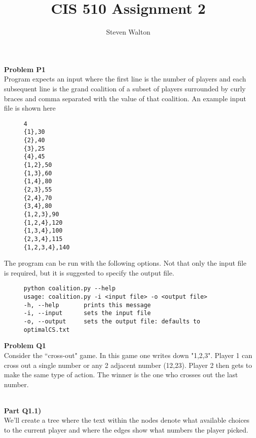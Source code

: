\documentclass[12pt,letter]{article}
\newcommand{\problem}[1]{\vspace{3mm}\Large\textbf{{Problem {#1}\vspace{3mm}}}\normalsize\\}
\newcommand{\ppart}[1]{\vspace{2mm}\large\textbf{\\Part {#1})\vspace{2mm}}\normalsize\\}
\begin{document}
\title{CIS 510 Assignment 2}
\author{Steven Walton}
\maketitle
\problem{P1}
Program expects an input where the first line is the number of players
and each subsequent line is the grand coalition of a subset of players surrounded
by curly braces and comma separated with the value of that coalition.
An example input file is shown here
\begin{figure}[h]
    \centering
\begin{lstlisting}
4
{1},30
{2},40
{3},25
{4},45
{1,2},50
{1,3},60
{1,4},80
{2,3},55
{2,4},70
{3,4},80
{1,2,3},90
{1,2,4},120
{1,3,4},100
{2,3,4},115
{1,2,3,4},140
\end{lstlisting}
\end{figure}

The program can be run with the following options. Not that only the input file
is required, but it is suggested to specify the output file. 
\begin{figure}[h!]
    \centering
\begin{lstlisting}
python coalition.py --help
usage: coalition.py -i <input file> -o <output file>
-h, --help       prints this message
-i, --input      sets the input file
-o, --output     sets the output file: defaults to optimalCS.txt
\end{lstlisting}
\end{figure}
\FloatBarrier

\problem{Q1}
Consider the ``cross-out" game. In this game one writes down "1,2,3". Player
1 can cross out a single number or any 2 adjacent number (12,23). Player
2 then gets to make the same type of action. The winner is the one who crosses
out the last number.

\ppart{Q1.1}
We'll create a tree where the text within the nodes denote what available choices
to the current player and where the edges show what numbers the player picked.
\end{document}
